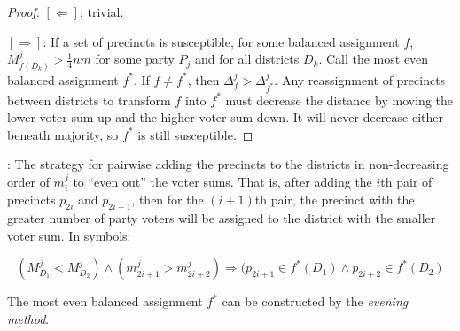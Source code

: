 \documentclass[12pt]{article}
\begin{document}
\begin{proof}
$[\Leftarrow]$: trivial.

$[\Rightarrow]$: If a set of precincts is susceptible, for some balanced
assignment $f$, $M^{j}_{f(D_k)} > \frac{1}{4}nm$ for some party $P_j$
and for all districts $D_k$. Call the most even balanced assignment $f^{*}$.
If $f \ne f^{*}$,
then $\Delta^{j}_{f} > \Delta^{j}_{f^{*}}$. Any reassignment of precincts
between districts to transform $f$ into $f^{*}$ must decrease the distance
by moving the lower voter sum up and the higher voter sum down. It will
never decrease either beneath majority, so $f^{*}$ is still susceptible.
\end{proof}

\begin{definition}:
The strategy for pairwise adding the precincts to the districts in
non-decreasing order of $m^{j}_i$ to ``even out'' the voter sums.
 That is, after adding the $i$th pair
of precincts $p_{2i}$ and $p_{2i-1}$, then for the $(i+1)$th pair,
the precinct with the greater number of party voters will be assigned to
the district with the smaller voter sum.
In symbols:

\begin{displaymath}
(M^{j}_{D_1} < M^{j}_{D_2}) \land (m^{j}_{2i+1} > m^{j}_{2i+2}) \Rightarrow (p_{2i+1} \in f^{*}(D_1) \land p_{2i+2} \in f^{*}(D_2)
\end{displaymath}
\end{definition}

\begin{lemma}
The most even balanced assignment $f^{*}$ can be constructed by the
\textit{evening method}.
\end{lemma}
\end{document}
